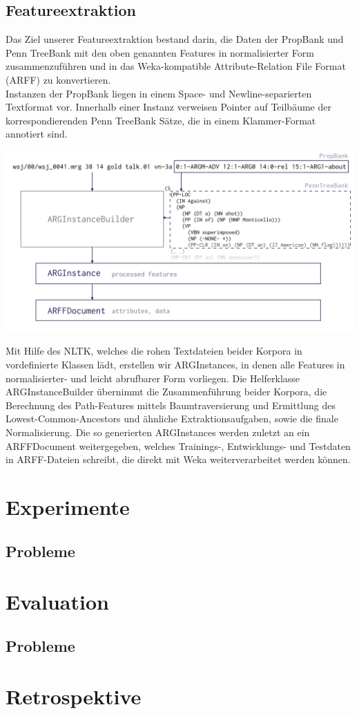 \documentclass[]{article}
\begin{document}
\subsection{Featureextraktion}
Das Ziel unserer Featureextraktion bestand darin, die Daten der PropBank und Penn TreeBank mit den oben genannten Features in normalisierter Form zusammenzuführen und in das Weka-kompatible Attribute-Relation File Format (ARFF) zu konvertieren.\\
Instanzen der PropBank liegen in einem Space- und Newline-separierten Textformat vor. Innerhalb einer Instanz verweisen Pointer auf Teilbäume der korrespondierenden Penn TreeBank Sätze, die in einem Klammer-Format annotiert sind.
\begin{center}
	\includegraphics[scale=0.23]{argext_graphic}
\end{center}
Mit Hilfe des NLTK, welches die rohen Textdateien beider Korpora in vordefinierte Klassen lädt, erstellen wir ARGInstances, in denen alle Features in normalisierter- und leicht abrufbarer Form vorliegen. Die Helferklasse ARGInstanceBuilder übernimmt die Zusammenführung beider Korpora, die Berechnung des Path-Features mittels Baumtraversierung und Ermittlung des Lowest-Common-Ancestors und ähnliche Extraktionsaufgaben, sowie die finale Normalisierung. Die so generierten ARGInstances werden zuletzt an ein ARFFDocument weitergegeben, welches Trainings-, Entwicklungs- und Testdaten in ARFF-Dateien schreibt, die direkt mit Weka weiterverarbeitet werden können.

\section{Experimente}
\subsection{Probleme}

\section{Evaluation}
\subsection{Probleme}

\section{Retrospektive}


\end{document}
